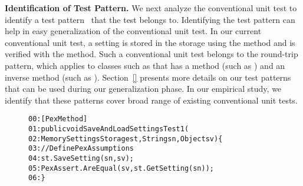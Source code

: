\textbf{Identification of Test Pattern.} We next analyze the conventional unit test to identify a test pattern~\cite{PEXDOC} that the test belongs to. Identifying the test pattern can help in easy generalization of the conventional unit test. In our current conventional unit test, a setting is stored in the storage using the  method and is verified with the  method. Such a conventional unit test belongs to the round-trip pattern, which applies to classes such as  that has a method (such as ) and an inverse method (such as ). Section~\ref{} presents more details on our test patterns that can be used during our generalization phase. In our empirical study, we identify that these patterns cover broad range of existing conventional unit tests.

\begin{figure}[t]
\begin{CodeOut}
\begin{alltt}
00:[PexMethod]
01:public void SaveAndLoadSettingsTest1(
02:\hspace*{0.1in}MemorySettingsStorage st, String sn, Object sv) \{
03:\hspace*{0.2in}//Define Pex Assumptions
04:\hspace*{0.2in}st.SaveSetting(sn, sv);
05:\hspace*{0.2in}PexAssert.AreEqual(sv, st.GetSetting(sn));
06:\}
\end{alltt}
\end{CodeOut}
\end{figure}

